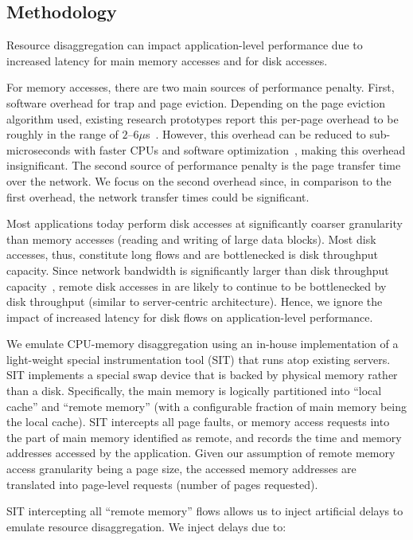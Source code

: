 \subsection{Methodology}
\label{ssec:rmethod}
Resource disaggregation can impact application-level performance due to increased latency for main memory accesses and for disk accesses.

For memory accesses, there are two main sources of performance penalty. First, software overhead for trap and page eviction. Depending on the page eviction algorithm used, existing research prototypes report this per-page overhead to be roughly in the range of $2$--$6\mu$s~\cite{x1, x2, x3}. However, this overhead can be reduced to sub-microseconds with faster CPUs and software optimization~\cite{y1, y2, y3}, making this overhead insignificant. The second source of performance penalty is the page transfer time over the network. We focus on the second overhead since, in comparison to the first overhead, the network transfer times could be significant. 

Most applications today perform disk accesses at significantly coarser granularity than memory accesses (reading and writing of large data blocks). Most disk accesses, thus, constitute long flows and are bottlenecked is disk throughput capacity. Since network bandwidth is significantly larger than disk throughput capacity~\cite{z1, z2}, remote disk accesses in \dis are likely to continue to be bottlenecked by disk throughput (similar to server-centric architecture). Hence, we ignore the impact of increased latency for disk flows on application-level performance.

We emulate CPU-memory disaggregation using an in-house implementation of a light-weight special instrumentation tool (SIT) that runs atop existing servers. SIT implements a special swap device that is backed by physical memory rather than a disk. Specifically, the main memory is logically partitioned into ``local cache'' and ``remote memory'' (with a configurable fraction of main memory being the local cache). SIT intercepts all page faults, or memory access requests into the part of main memory identified as remote, and records the time and memory addresses accessed by the application. Given our assumption of remote memory access granularity being a page size, the accessed memory addresses are translated into page-level requests (number of pages requested). 

SIT intercepting all ``remote memory'' flows allows us to inject artificial delays to emulate resource disaggregation. We inject delays due to:

